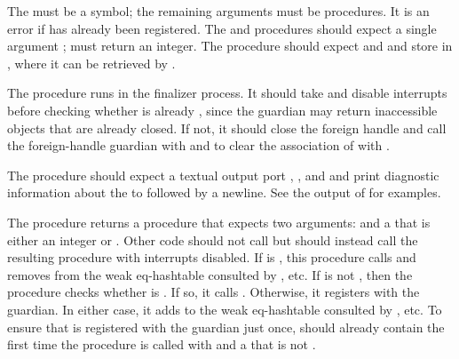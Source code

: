 The  must be a symbol; the remaining arguments must be
procedures.  It is an error if  has already been registered.
The  and  procedures should expect a
single argument ;  must return an integer.
The  procedure should expect  and  and
store  in , where it can be retrieved by .

The  procedure runs in the finalizer process.
It should take  and disable interrupts before checking whether
 is already ,
since the guardian may return inaccessible objects that are already closed.
If not, it should close the foreign handle and call the foreign-handle guardian
with  and  to clear the association of  with .

The  procedure should expect a textual output port ,
, and  and print diagnostic information about the
 to  followed by a newline.
See the output of  for examples.

The  procedure returns a procedure
that expects two arguments:  and a  that is
either an integer or .
Other code should not call  but should instead
call the resulting procedure with interrupts disabled.
If  is , this procedure calls
and removes  from the weak eq-hashtable consulted by
, etc.
If  is not , then
the procedure checks whether 
is .
If so, it calls .
Otherwise, it registers  with the guardian.
In either case, it adds  to the weak eq-hashtable
consulted by , etc.
To ensure that  is registered with the guardian just once,
 should already contain  the first time
the procedure is called with  and a  that
is not .

\begin{procedure}
\end{procedure}
\returns{} 

